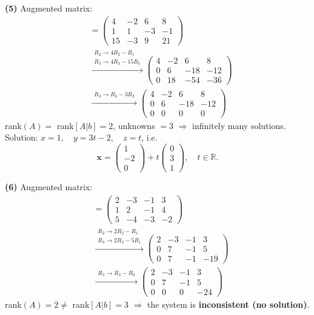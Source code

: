 \noindent\textbf{(5)} Augmented matrix:
\begin{align*}
[A|b] &= \left(\begin{array}{ccc|c}4 & -2 & 6 & 8 \\ 1 & 1 & -3 & -1 \\ 15 & -3 & 9 & 21\end{array}\right) \\
&\xrightarrow{\substack{R_2\to 4R_2-R_1\\ R_3\to 4R_3-15R_1}} \left(\begin{array}{ccc|c}4 & -2 & 6 & 8 \\ 0 & 6 & -18 & -12 \\ 0 & 18 & -54 & -36\end{array}\right) \\
&\xrightarrow{\substack{R_3\to R_3-3R_2}} \left(\begin{array}{ccc|c}4 & -2 & 6 & 8 \\ 0 & 6 & -18 & -12 \\ 0 & 0 & 0 & 0\end{array}\right)
\end{align*}
rank$(A)=$ rank$[A|b]=2$, unknowns $=3$ $\Rightarrow$ infinitely many solutions. Solution: $x=1, \quad y=3 t - 2, \quad z=t$, i.e. \[ \mathbf{x}=\begin{pmatrix}1 \\ -2 \\ 0\end{pmatrix} + t\begin{pmatrix}0 \\ 3 \\ 1\end{pmatrix}, \quad t\in\mathbb{R}. \]

\noindent\textbf{(6)} Augmented matrix:
\begin{align*}
[A|b] &= \left(\begin{array}{ccc|c}2 & -3 & -1 & 3 \\ 1 & 2 & -1 & 4 \\ 5 & -4 & -3 & -2\end{array}\right) \\
&\xrightarrow{\substack{R_2\to 2R_2-R_1\\ R_3\to 2R_3-5R_1}} \left(\begin{array}{ccc|c}2 & -3 & -1 & 3 \\ 0 & 7 & -1 & 5 \\ 0 & 7 & -1 & -19\end{array}\right) \\
&\xrightarrow{\substack{R_3\to R_3-R_2}} \left(\begin{array}{ccc|c}2 & -3 & -1 & 3 \\ 0 & 7 & -1 & 5 \\ 0 & 0 & 0 & -24\end{array}\right)
\end{align*}
rank$(A)=2\neq$ rank$[A|b]=3$ $\Rightarrow$ the system is \textbf{inconsistent (no solution)}.

